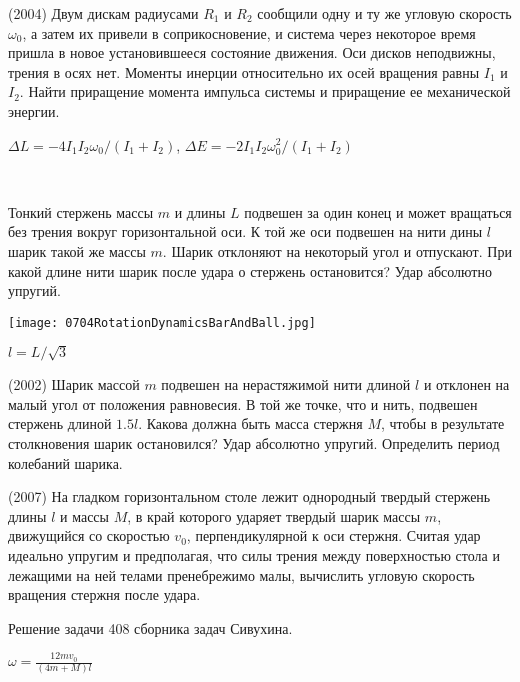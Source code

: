 \begin{ex}
(2004) Двум дискам радиусами $R_1$ и $R_2$ сообщили одну и ту же угловую скорость $\omega_0$, а затем их привели в соприкосновение, и система через некоторое время пришла в новое установившееся состояние движения. Оси дисков неподвижны, трения в осях нет. Моменты инерции относительно их осей вращения равны $I_1$ и $I_2$. Найти приращение момента импульса системы и приращение ее механической энергии.
\begin{ans}
$\Delta L = -4I_1I_2\omega_0/(I_1+I_2)$, $\Delta E = -2I_1I_2\omega_0^2/(I_1+I_2)$
\end{ans}
\end{ex}

\begin{ex}
\hspace{0pt} \\
\begin{minipage}{.65\textwidth}
Тонкий стержень массы $m$ и длины $L$ подвешен за один конец и может вращаться без трения вокруг горизонтальной оси. К той же оси подвешен на нити дины $l$ шарик такой же массы $m$. Шарик отклоняют на некоторый угол и отпускают. При какой длине нити шарик после удара о стержень остановится? Удар абсолютно упругий.
\end{minipage}
\begin{minipage}{.35\textwidth}
\centering
\texttt{[image: 0704RotationDynamicsBarAndBall.jpg]}
\end{minipage}
\begin{ans}
$l = L/\sqrt{3}$
\end{ans}
\end{ex}

\begin{ex}
(2002) Шарик массой $m$ подвешен на нерастяжимой нити длиной $l$ и отклонен на малый угол от положения равновесия. В той же точке, что и нить, подвешен стержень длиной $1.5l$. Какова должна быть масса стержня $M$, чтобы в результате столкновения шарик остановился? Удар абсолютно упругий. Определить период колебаний шарика.
\begin{ans}

\end{ans}
\end{ex}

\begin{ex}
(2007) На гладком горизонтальном столе лежит однородный твердый стержень длины $l$ и массы $M$, в край которого ударяет твердый шарик массы $m$, движущийся со скоростью $v_0$, перпендикулярной к оси стержня. Считая удар идеально упругим и предполагая, что силы трения между поверхностью стола и лежащими на ней телами пренебрежимо малы, вычислить угловую скорость вращения стержня после удара.
\begin{sol}
Решение задачи 408 сборника задач Сивухина.
\end{sol}
\begin{ans}
$\omega = \frac{12mv_0}{(4m+M)l}$
\end{ans}
\end{ex}


